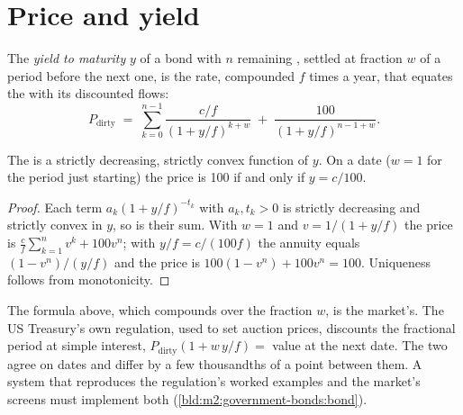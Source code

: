 \section{Price and yield}

\begin{definition}\label{def:m2:government-bonds:ytm}
The \emph{yield to maturity} $y$ of a bond with $n$
remaining , settled at fraction $w$ of a period before the next one,
is the rate, compounded $f$ times a year, that equates the  with
its discounted flows:
\[
P_{\text{dirty}} \;=\; \sum_{k=0}^{n-1} \frac{c/f}{(1 + y/f)^{k+w}} \;+\; \frac{100}{(1 + y/f)^{n-1+w}} .
\]
\end{definition}

\begin{proposition}\label{prop:m2:government-bonds:priceyield}
The  is a strictly decreasing, strictly convex function of $y$. On
a  date ($w = 1$ for the period just starting) the price is 100 if and
only if $y = c/100$.
\end{proposition}
\begin{proof}
Each term $a_k (1 + y/f)^{-t_k}$ with $a_k, t_k > 0$ is strictly decreasing
and strictly convex in $y$, so is their sum. With $w = 1$ and $v = 1/(1 +
y/f)$ the price is $\frac cf \sum_{k=1}^{n} v^k + 100 v^n$; with $y/f =
c/(100 f)$ the annuity equals $(1 - v^n)/(y/f)$ and the price is $100(1 - v^n)
+ 100 v^n = 100$. Uniqueness follows from monotonicity.
\end{proof}

\begin{remark}\label{rem:m2:government-bonds:conventions}
The formula above, which compounds over the fraction $w$, is the market's.
The US Treasury's own regulation, used to set auction prices, discounts the
fractional period at simple interest, $P_{\text{dirty}}(1 + w\,y/f) =$ value at
the next  date. The two agree on  dates and differ by a few
thousandths of a point between them. A system that reproduces the
regulation's worked examples and the market's screens must implement both
(\cref{bld:m2:government-bonds:bond}).
\end{remark}

